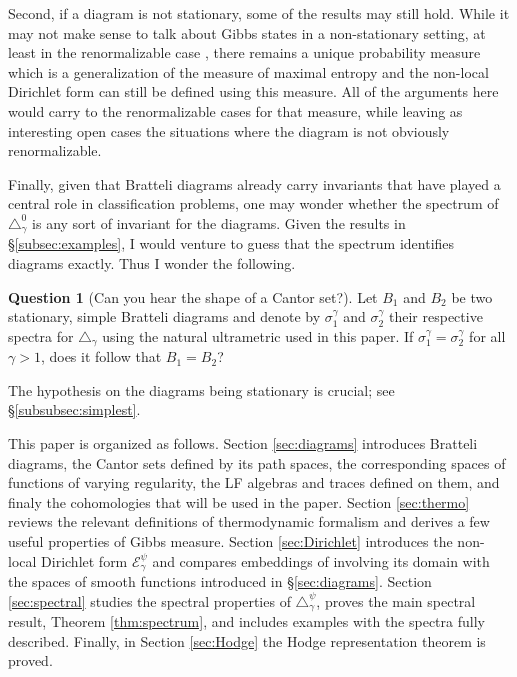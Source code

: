 \documentclass[12pt]{amsart}
\theoremstyle{plain}
\theoremstyle{definition}
\newtheorem*{ques}{Question}
\begin{document}
Second, if a diagram is not stationary, some of the results may still hold. While it may not make sense to talk about Gibbs states in a non-stationary setting, at least in the renormalizable case \cite{T:CohEq}, there remains a unique probability measure which is a generalization of the measure of maximal entropy and the non-local Dirichlet form can still be defined using this measure. All of the arguments here would carry to the renormalizable cases for that measure, while leaving as interesting open cases the situations where the diagram is not obviously renormalizable.

Finally, given that Bratteli diagrams already carry invariants that have played a central role in classification problems, one may wonder whether the spectrum of $\triangle_\gamma^0$ is any sort of invariant for the diagrams. Given the results in \S \ref{subsec:examples}, I would venture to guess that the spectrum identifies diagrams exactly. Thus I wonder the following.
\begin{ques}[Can you hear the shape of a Cantor set?]
    Let $B_1$ and $B_2$ be two stationary, simple Bratteli diagrams and denote by $\sigma_1^\gamma$ and $\sigma_2^\gamma$ their respective spectra for $\triangle_\gamma$ using the natural ultrametric used in this paper. If $\sigma_1^\gamma = \sigma_2^\gamma$ for all $\gamma>1$, does it follow that $B_1 = B_2$?
\end{ques}
The hypothesis on the diagrams being stationary is crucial; see \S \ref{subsubsec:simplest}.

This paper is organized as follows. Section \ref{sec:diagrams} introduces Bratteli diagrams, the Cantor sets defined by its path spaces, the corresponding spaces of functions of varying regularity, the LF algebras and traces defined on them, and finaly the cohomologies that will be used in the paper. Section \ref{sec:thermo} reviews the relevant definitions of thermodynamic formalism and derives a few useful properties of Gibbs measure. Section \ref{sec:Dirichlet} introduces the non-local Dirichlet form $\mathcal{E}_\gamma^\psi$ and compares embeddings of involving its domain with the spaces of smooth functions introduced in \S \ref{sec:diagrams}. Section \ref{sec:spectral} studies the spectral properties of $\triangle_\gamma^\psi$, proves the main spectral result, Theorem \ref{thm:spectrum}, and includes examples with the spectra fully described. Finally, in Section \ref{sec:Hodge} the Hodge representation theorem is proved.
\end{document}
